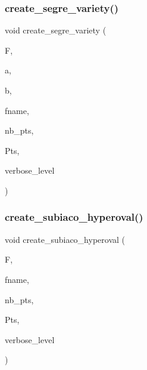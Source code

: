 \mbox{\label{geometric__object_8_c_a8d611ac4f8c2493ac23b52a9d7fe7a82}} 
\subsubsection{\texorpdfstring{create\+\_\+segre\+\_\+variety()}{create\_segre\_variety()}}
{\footnotesize\ttfamily void create\+\_\+segre\+\_\+variety (\begin{DoxyParamCaption}\item[{\mbox{\hyperlink{classfinite__field}{finite\+\_\+field}} $\ast$}]{F,  }\item[{\mbox{\hyperlink{galois_8h_a09fddde158a3a20bd2dcadb609de11dc}{I\+NT}}}]{a,  }\item[{\mbox{\hyperlink{galois_8h_a09fddde158a3a20bd2dcadb609de11dc}{I\+NT}}}]{b,  }\item[{\mbox{\hyperlink{galois_8h_ab6cc7b4aeb6ea31aba2b3fbfc83ff5e6}{B\+Y\+TE}} $\ast$}]{fname,  }\item[{\mbox{\hyperlink{galois_8h_a09fddde158a3a20bd2dcadb609de11dc}{I\+NT}} \&}]{nb\+\_\+pts,  }\item[{\mbox{\hyperlink{galois_8h_a09fddde158a3a20bd2dcadb609de11dc}{I\+NT}} $\ast$\&}]{Pts,  }\item[{\mbox{\hyperlink{galois_8h_a09fddde158a3a20bd2dcadb609de11dc}{I\+NT}}}]{verbose\+\_\+level }\end{DoxyParamCaption})}

\mbox{\label{geometric__object_8_c_ae5503f90cbc88ad9557ff4baa622b360}} 
\subsubsection{\texorpdfstring{create\+\_\+subiaco\+\_\+hyperoval()}{create\_subiaco\_hyperoval()}}
{\footnotesize\ttfamily void create\+\_\+subiaco\+\_\+hyperoval (\begin{DoxyParamCaption}\item[{\mbox{\hyperlink{classfinite__field}{finite\+\_\+field}} $\ast$}]{F,  }\item[{\mbox{\hyperlink{galois_8h_ab6cc7b4aeb6ea31aba2b3fbfc83ff5e6}{B\+Y\+TE}} $\ast$}]{fname,  }\item[{\mbox{\hyperlink{galois_8h_a09fddde158a3a20bd2dcadb609de11dc}{I\+NT}} \&}]{nb\+\_\+pts,  }\item[{\mbox{\hyperlink{galois_8h_a09fddde158a3a20bd2dcadb609de11dc}{I\+NT}} $\ast$\&}]{Pts,  }\item[{\mbox{\hyperlink{galois_8h_a09fddde158a3a20bd2dcadb609de11dc}{I\+NT}}}]{verbose\+\_\+level }\end{DoxyParamCaption})}

